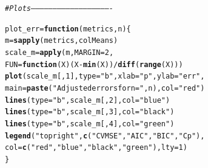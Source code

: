 \documentclass[11pt]{article}\usepackage[]{graphicx}\usepackage[]{color}
\makeatletter
\newcommand{\hlnum}[1]{\textcolor[rgb]{0.686,0.059,0.569}{#1}}%
\newcommand{\hlstr}[1]{\textcolor[rgb]{0.192,0.494,0.8}{#1}}%
\newcommand{\hlcom}[1]{\textcolor[rgb]{0.678,0.584,0.686}{\textit{#1}}}%
\newcommand{\hlopt}[1]{\textcolor[rgb]{0,0,0}{#1}}%
\newcommand{\hlstd}[1]{\textcolor[rgb]{0.345,0.345,0.345}{#1}}%
\newcommand{\hlkwa}[1]{\textcolor[rgb]{0.161,0.373,0.58}{\textbf{#1}}}%
\newcommand{\hlkwb}[1]{\textcolor[rgb]{0.69,0.353,0.396}{#1}}%
\newcommand{\hlkwc}[1]{\textcolor[rgb]{0.333,0.667,0.333}{#1}}%
\newcommand{\hlkwd}[1]{\textcolor[rgb]{0.737,0.353,0.396}{\textbf{#1}}}%
\newenvironment{kframe}{%
 \def\at@end@of@kframe{}%
 \ifinner\ifhmode%
  \def\at@end@of@kframe{\end{minipage}}%
  \begin{minipage}{\columnwidth}%
 \fi\fi%
 \def\FrameCommand##1{\hskip\@totalleftmargin \hskip-\fboxsep
 \colorbox{shadecolor}{##1}\hskip-\fboxsep
     \hskip-\linewidth \hskip-\@totalleftmargin \hskip\columnwidth}%
 \MakeFramed {\advance\hsize-\width
   \@totalleftmargin\z@ \linewidth\hsize
   \@setminipage}}%
 {\par\unskip\endMakeFramed%
 \at@end@of@kframe}
\newenvironment{knitrout}{}{} %
\makeatother
\begin{document}
\begin{knitrout}
\color{fgcolor}\begin{kframe}
\begin{alltt}
\hlcom{# Plots -------------------------------------------------------}

\hlstd{plot_err} \hlkwb{=} \hlkwa{function}\hlstd{(}\hlkwc{metrics}\hlstd{,}\hlkwc{n}\hlstd{)\{}
  \hlstd{m} \hlkwb{=} \hlkwd{sapply}\hlstd{(metrics, colMeans)}
  \hlstd{scale_m} \hlkwb{=} \hlkwd{apply}\hlstd{(m,} \hlkwc{MARGIN} \hlstd{=} \hlnum{2}\hlstd{,}
                  \hlkwc{FUN} \hlstd{=} \hlkwa{function}\hlstd{(}\hlkwc{X}\hlstd{) (X} \hlopt{-} \hlkwd{min}\hlstd{(X))}\hlopt{/}\hlkwd{diff}\hlstd{(}\hlkwd{range}\hlstd{(X)))}
  \hlkwd{plot}\hlstd{(scale_m[,}\hlnum{1}\hlstd{],}\hlkwc{type}\hlstd{=}\hlstr{"b"}\hlstd{,}\hlkwc{xlab}\hlstd{=}\hlstr{"p"}\hlstd{,}\hlkwc{ylab}\hlstd{=}\hlstr{"err"}\hlstd{,}
       \hlkwc{main}\hlstd{=}\hlkwd{paste}\hlstd{(}\hlstr{"Adjusted errors for n ="}\hlstd{,n),} \hlkwc{col}\hlstd{=}\hlstr{"red"}\hlstd{)}
  \hlkwd{lines}\hlstd{(}\hlkwc{type}\hlstd{=}\hlstr{"b"}\hlstd{,scale_m[,}\hlnum{2}\hlstd{],}\hlkwc{col}\hlstd{=}\hlstr{"blue"}\hlstd{)}
  \hlkwd{lines}\hlstd{(}\hlkwc{type}\hlstd{=}\hlstr{"b"}\hlstd{,scale_m[,}\hlnum{3}\hlstd{],}\hlkwc{col}\hlstd{=}\hlstr{"black"}\hlstd{)}
  \hlkwd{lines}\hlstd{(}\hlkwc{type}\hlstd{=}\hlstr{"b"}\hlstd{,scale_m[,}\hlnum{4}\hlstd{],}\hlkwc{col}\hlstd{=}\hlstr{"green"}\hlstd{)}
  \hlkwd{legend}\hlstd{(}\hlstr{"topright"}\hlstd{,}\hlkwd{c}\hlstd{(}\hlstr{"CV MSE"}\hlstd{,}\hlstr{"AIC"}\hlstd{,}\hlstr{"BIC"}\hlstd{,}\hlstr{"Cp"}\hlstd{),}
         \hlkwc{col}\hlstd{=}\hlkwd{c}\hlstd{(}\hlstr{"red"}\hlstd{,}\hlstr{"blue"}\hlstd{,}\hlstr{"black"}\hlstd{,}\hlstr{"green"}\hlstd{),}\hlkwc{lty}\hlstd{=}\hlnum{1}\hlstd{)}
\hlstd{\}}


\end{alltt}
\end{kframe}
\end{knitrout}
\end{document}

